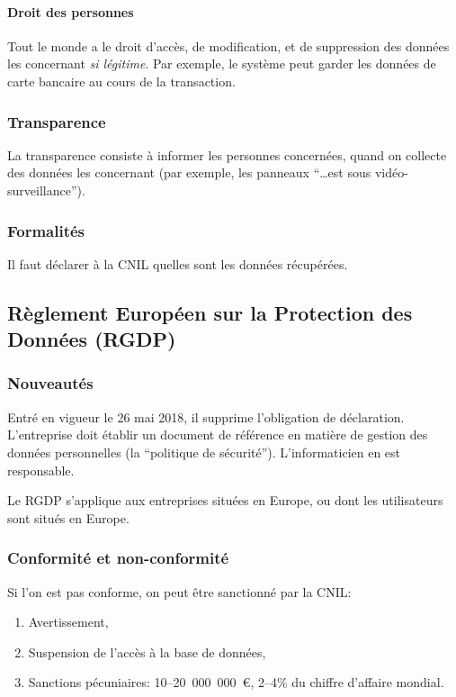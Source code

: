 \documentclass[10pt,a4paper,french]{article}
\begin{document}
\paragraph{Droit des personnes}
Tout le monde a le droit d'accès, de modification, et de suppression des données les concernant \textit{si légitime}. Par exemple, le système peut garder les données de carte bancaire au cours de la transaction.

\subsubsection{Transparence}

La transparence consiste à informer les personnes concernées, quand on collecte des données les concernant (par exemple, les panneaux ``\ldots est sous vidéo-surveillance'').

\subsubsection{Formalités}

Il faut déclarer à la CNIL quelles sont les données récupérées.

\subsection{Règlement Européen sur la Protection des Données (RGDP)}\label{s:rgdp}

\subsubsection{Nouveautés}

Entré en vigueur le 26 mai 2018, il supprime l'obligation de déclaration. L'entreprise doit établir un document de référence en matière de gestion des données personnelles (la ``politique de sécurité'').
L'informaticien en est responsable.

Le RGDP s'applique aux entreprises situées en Europe, ou dont les utilisateurs sont situés en Europe.

\subsubsection{Conformité et non-conformité}

Si l'on est pas conforme, on peut être sanctionné par la CNIL:
\begin{enumerate}
\item Avertissement,
\item Suspension de l'accès à la base de données,
\item Sanctions pécuniaires: 10--20~000~000~\euro, 2--4\% du chiffre d'affaire mondial.
\end{enumerate}
\end{document}
